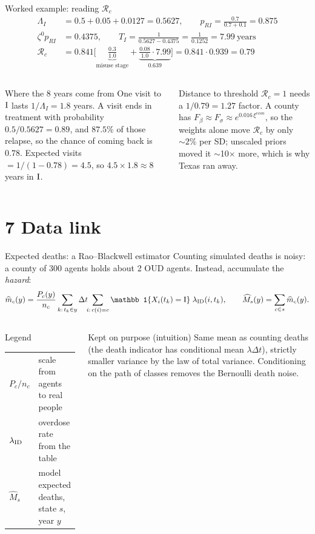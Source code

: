 ﻿\documentclass[9pt,aspectratio=169]{beamer}
\newenvironment{kept}{\begin{exampleblock}{Kept on purpose (intuition)}\small}{\end{exampleblock}}
\newenvironment{legend}{\begin{block}{Legend}\scriptsize}{\end{block}}
\newcommand{\Rzero}{\mathcal R_c}
\newcommand{\ind}{\mathbb 1}
\begin{document}
\begin{frame}{Worked example: reading $\Rzero$}
 \small
 \begin{align*}
  \Lambda_I&=0.5+0.05+0.0127=0.5627,\qquad p_{RI}=\frac{0.7}{0.7+0.1}=0.875\\
  \zeta^0p_{RI}&=0.4375,\qquad T_I=\frac1{0.5627-0.4375}=\frac1{0.1252}=7.99\ \text{years}\\
  \Rzero&=0.841\Big[\underbrace{\tfrac{0.3}{1.0}}_{\text{misuse stage}}+\underbrace{\tfrac{0.08}{1.0}\cdot7.99}_{0.639}\Big]=0.841\cdot0.939=\mathbf{0.79}
 \end{align*}
 \begin{columns}[T]
 \begin{block}{Where the 8 years come from}\small
  One visit to $\mathrm{I}$ lasts $1/\Lambda_I=1.8$ years. A visit ends in treatment with probability $0.5/0.5627=0.89$, and $87.5\%$ of those relapse, so the chance of coming back is $0.78$. Expected visits $=1/(1-0.78)=4.5$, so $4.5\times1.8\approx8$ years in $\mathrm{I}$.
 \end{block}
 \begin{block}{Distance to threshold}\small
  $\Rzero=1$ needs a $1/0.79=1.27$ factor. A county has $F_\beta\approx F_\sigma\approx e^{0.016\,\xi^{econ}}$, so the weights alone move $\Rzero$ by only $\sim2\%$ per SD; unscaled priors moved it $\sim$10$\times$ more, which is why Texas ran away.
 \end{block}
 \end{columns}
\end{frame}

\section{7 Data link}
\begin{frame}{Expected deaths: a Rao--Blackwell estimator}
 Counting simulated deaths is noisy: a county of 300 agents holds about 2 OUD agents. Instead, accumulate the \emph{hazard}:
 \[
  \widehat m_c(y)=\frac{P_c(y)}{n_c}\sum_{k:\,t_k\in y}\Delta t\!\!\sum_{i:\,c(i)=c}\ind\{X_i(t_k)=\Ic\}\;\lambda_{\Ic\Dc}(i,t_k),\qquad
  \widehat M_s(y)=\sum_{c\in s}\widehat m_c(y).
 \]
 \begin{columns}[T]
 \begin{legend}
 \begin{tabular}{@{}p{1.3cm}p{5.6cm}@{}}
 $P_c/n_c$ & scale from agents to real people\\
 $\lambda_{\mathrm{I}\mathrm{D}}$ & overdose rate from the table\\
 $\widehat M_s$ & model expected deaths, state $s$, year $y$
 \end{tabular}
 \end{legend}
 \begin{kept}
  Same mean as counting deaths (the death indicator has conditional mean $\lambda\Delta t$), strictly smaller variance by the law of total variance. Conditioning on the path of classes removes the Bernoulli death noise.
 \end{kept}
 \end{columns}
\end{frame}
\end{document}
